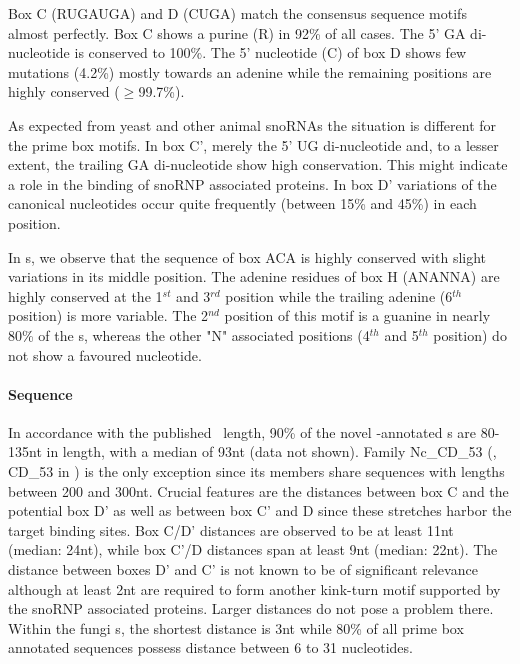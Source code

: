 Box C (RUGAUGA) and D (CUGA) match the consensus sequence motifs
almost perfectly. Box C shows a purine (R) in 92\% of all cases.  The
5' GA di-nucleotide is conserved to 100\%.  The 5' nucleotide (C) of
box D shows few mutations (4.2\%) mostly towards an adenine while the
remaining positions are highly conserved ($\ge$99.7\%).

As expected from yeast and other animal snoRNAs the situation is
different for the prime box motifs.  In box C', merely the 5' UG
di-nucleotide and, to a lesser extent, the trailing GA di-nucleotide
show high conservation.  This might indicate a role in the binding of
snoRNP associated proteins.  In box D' variations of the canonical
nucleotides occur quite frequently (between 15\% and 45\%) in each
position.

In \haca s, we observe that the sequence of box ACA is highly
conserved with slight variations in its middle position. The adenine
residues of box H (ANANNA) are highly conserved at the 1$^{st}$ and
3$^{rd}$ position while the trailing adenine (6$^{th}$ position) is
more variable. The 2$^{nd}$ position of this motif is a guanine in
nearly 80\% of the \haca s, whereas the other "N" associated positions
(4$^{th}$ and 5$^{th}$ position) do not show a favoured nucleotide.

\paragraph{\textbf{Sequence}}  In accordance with the published \cd\
length, 90\% of the novel \snostrip-annotated \sno s are 80-135nt in
length, with a median of 93nt (data not shown).  Family Nc\_CD\_53
(\ncr, CD\_53 in \snostrip) is the only exception since its members
share sequences with lengths between 200 and 300nt.  Crucial features
are the distances between box C and the potential box D' as well as
between box C' and D since these stretches harbor the target binding
sites.  Box C/D' distances are observed to be at least 11nt (median:
24nt), while box C'/D distances span at least 9nt (median: 22nt).  The
distance between boxes D' and C' is not known to be of significant
relevance although at least 2nt are required to form another kink-turn
motif supported by the snoRNP associated proteins.  Larger distances
do not pose a problem there.  Within the fungi \sno s, the shortest
distance is 3nt while 80\% of all prime box annotated sequences
possess distance between 6 to 31 nucleotides.

